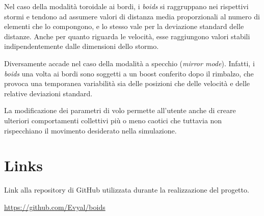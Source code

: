 \documentclass[10pt,a4paper]{article}
\begin{document}
 Nel caso della modalità toroidale ai bordi, i \textit{boids} si raggruppano nei rispettivi stormi e tendono ad assumere valori di distanza media proporzionali al numero di elementi che lo compongono, e lo stesso vale per la deviazione standard delle distanze. Anche per quanto riguarda le velocità, esse raggiungono valori stabili indipendentemente dalle dimensioni dello stormo.

Diversamente accade nel caso della modalità a specchio (\textit{mirror mode}). Infatti, i \textit{boids} una volta ai bordi sono soggetti a un boost conferito dopo il rimbalzo, che provoca una temporanea variabilità sia delle posizioni che delle velocità e delle relative deviazioni standard.

La modificazione dei parametri di volo permette all'utente anche di creare ulteriori comportamenti collettivi più o meno caotici che tuttavia non rispecchiano il movimento desiderato nella simulazione.

\section{Links}

\setlength{\parindent}{20pt}
Link alla repository di GitHub utilizzata durante la realizzazione del progetto.

\url{https://github.com/Evyal/boids}
\end{document}
